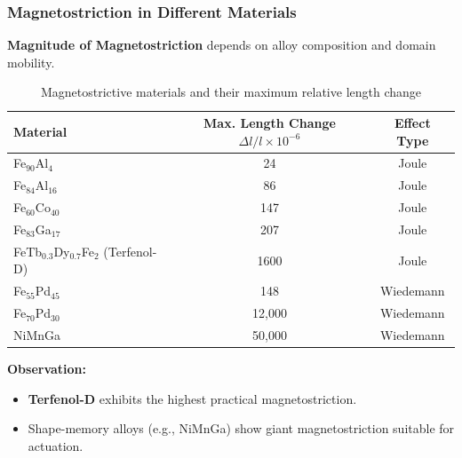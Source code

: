 \begin{frame}
	\frametitle{Magnetostriction in Different Materials}
    \small
    \textbf{Magnitude of Magnetostriction} depends on alloy composition and domain mobility.
    \begin{table}
        \centering
        \begin{tabular}{@{}lcc@{}}
            \toprule
            \textbf{Material} & \textbf{Max. Length Change $\Delta l / l \times 10^{-6}$} & \textbf{Effect Type} \\
            \midrule
            Fe$_{90}$Al$_4$                           & 24     & Joule \\
            Fe$_{84}$Al$_{16}$                        & 86     & Joule \\
            Fe$_{60}$Co$_{40}$                        & 147    & Joule \\
            Fe$_{83}$Ga$_{17}$                        & 207    & Joule \\
            FeTb$_{0.3}$Dy$_{0.7}$Fe$_2$ (Terfenol-D) & 1600   & Joule \\
            Fe$_{55}$Pd$_{45}$                        & 148    & Wiedemann \\
            Fe$_{70}$Pd$_{30}$                        & 12,000 & Wiedemann \\
            NiMnGa                                    & 50,000 & Wiedemann \\
            \bottomrule
        \end{tabular}
        \caption{Magnetostrictive materials and their maximum relative length change}\label{tab:magnetostrictive_materials}
    \end{table}
    \textbf{Observation:}
    \begin{itemize}
        \item \textbf{Terfenol-D} exhibits the highest practical magnetostriction.
        \item Shape-memory alloys (e.g., NiMnGa) show giant magnetostriction suitable for actuation.
    \end{itemize}
\end{frame}

